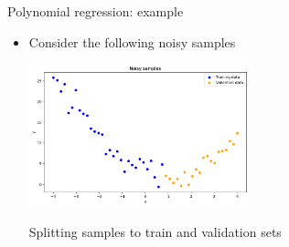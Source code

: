 \documentclass[serif, aspectratio=169]{beamer}
\begin{document}
\begin{frame}{Polynomial regression: example}
    \begin{itemize}
        \item Consider the following noisy samples
        \begin{center}
            \includegraphics[width=0.5\textwidth]{pic/Polynomial_regression/noisy_samples.png}
        \end{center}
        \vfile
        \begin{center}
            Splitting samples to train and validation sets
        \end{center}
    \end{itemize}
\end{frame}
\end{document}
